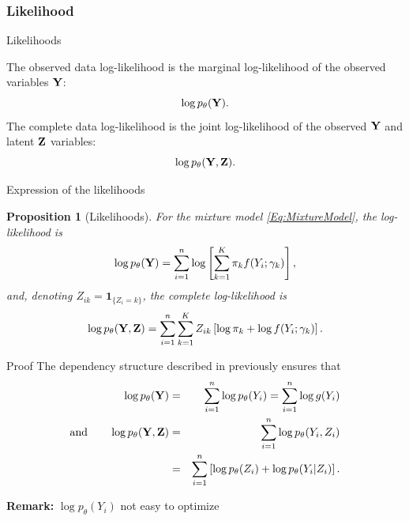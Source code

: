 \documentclass[compress,10pt]{beamer}
\newtheorem{proposition}{Proposition}
\begin{document}
\subsubsection{Likelihood} 
\begin{frame}{Likelihoods}
\begin{definition}
 The observed data log-likelihood is the marginal log-likelihood of the observed variables $\mathbf{Y}$:
  $$
  \log p_\theta(\mathbf{Y}).
  $$	
 The complete data log-likelihood is the joint log-likelihood of the observed $\mathbf{Y}$ and latent $\mathbf{Z}$ variables:
  $$
  \log p_\theta(\mathbf{Y}, \mathbf{Z}).
  $$
\end{definition}

\end{frame}



\begin{frame}{Expression of the likelihoods}
 \label{Prop:MixtureLikelihoods}
\begin{proposition}[Likelihoods]
  For the mixture model \eqref{Eq:MixtureModel}, the log-likelihood is
  $$
  \log p_\theta(\mathbf{Y}) = \sum_{i=1}^n \log \left[\sum_{k=1}^K  \pi_k f(Y_i; \gamma_k)\right],
  $$
  and, denoting $Z_{ik} = \mathbf{1}_{\{Z_i = k\}}$, the complete log-likelihood is
  $$
  \log p_\theta(\mathbf{Y}, \mathbf{Z}) = \sum_{i=1}^n \sum_{k=1}^K  Z_{ik} \left[\log \pi_k + \log f(Y_i; \gamma_k)\right].
  $$
\end{proposition}
\end{frame}

\begin{frame}{Proof}
The dependency structure described in previously ensures that
\begin{eqnarray*}
 \log p_\theta(\mathbf{Y}) & = & \sum_{i=1}^n \log p_\theta(Y_i) = \sum_{i=1}^n \log g(Y_i) \\
  \text{and} \qquad
 \log p_\theta(\mathbf{Y}, \mathbf{Z}) & = & \sum_{i=1}^n \log p_\theta(Y_i, Z_i) \\
 &=& \sum_{i=1}^n \left[\log p_\theta(Z_i) + \log p_\theta(Y_i | Z_i)\right].
\end{eqnarray*}

\textbf{Remark:} $ \log p_\theta(Y_i) $  not easy to optimize
\end{frame}
\end{document}
